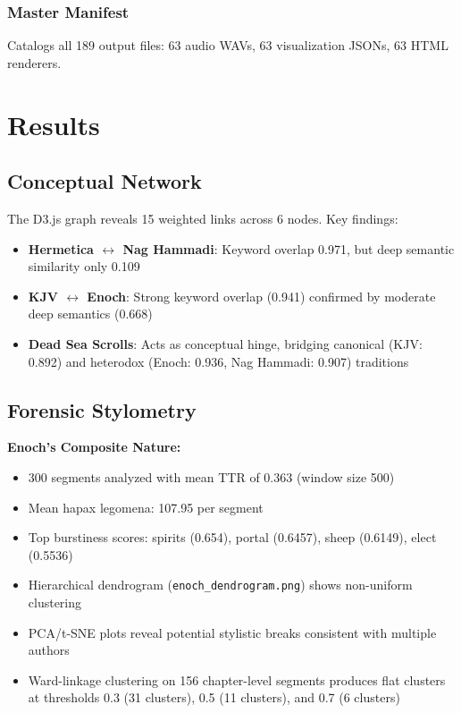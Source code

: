 \documentclass[11pt]{article}
\begin{document}
\subsubsection{Master Manifest}
Catalogs all 189 output files: 63 audio WAVs, 63 visualization JSONs, 63 HTML renderers.

\section{Results}

\subsection{Conceptual Network}

The D3.js graph reveals 15 weighted links across 6 nodes. Key findings:

\begin{itemize}
    \item \textbf{Hermetica $\leftrightarrow$ Nag Hammadi}: Keyword overlap 0.971, but deep semantic similarity only 0.109
    \item \textbf{KJV $\leftrightarrow$ Enoch}: Strong keyword overlap (0.941) confirmed by moderate deep semantics (0.668)
    \item \textbf{Dead Sea Scrolls}: Acts as conceptual hinge, bridging canonical (KJV: 0.892) and heterodox (Enoch: 0.936, Nag Hammadi: 0.907) traditions
\end{itemize}

\subsection{Forensic Stylometry}

\textbf{Enoch's Composite Nature:}
\begin{itemize}
    \item 300 segments analyzed with mean TTR of 0.363 (window size 500)
    \item Mean hapax legomena: 107.95 per segment
    \item Top burstiness scores: spirits (0.654), portal (0.6457), sheep (0.6149), elect (0.5536)
    \item Hierarchical dendrogram (\texttt{enoch\_dendrogram.png}) shows non-uniform clustering
    \item PCA/t-SNE plots reveal potential stylistic breaks consistent with multiple authors
    \item Ward-linkage clustering on 156 chapter-level segments produces flat clusters at thresholds 0.3 (31 clusters), 0.5 (11 clusters), and 0.7 (6 clusters)
\end{itemize}
\end{document}
